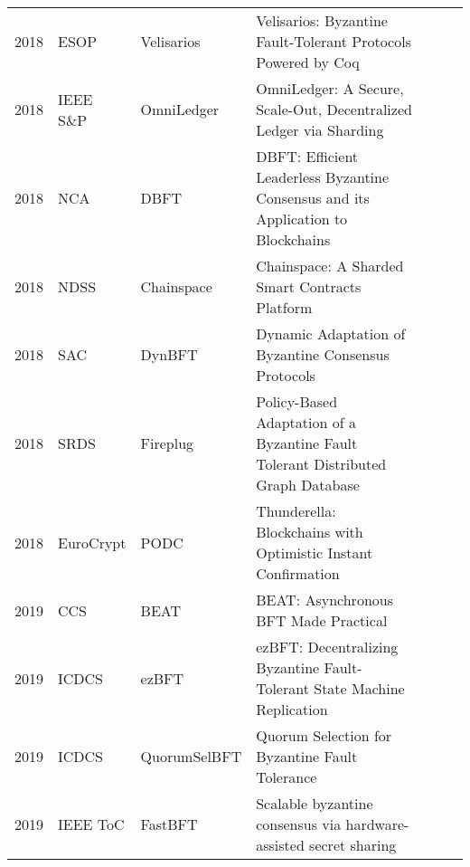 \documentclass{article}
\begin{document}
\begin{landscape}
\begin{table}[]
{\begin{tabular}{llll|l|l|l|}
2018 & ESOP              & Velisarios              & Velisarios: Byzantine Fault-Tolerant Protocols Powered by Coq                             &            &          &              \\ \cline{5-7} 
2018 & IEEE S\&P         & OmniLedger              & OmniLedger: A Secure, Scale-Out, Decentralized Ledger via Sharding                        &            &          &              \\ \cline{5-7} 
2018 & NCA               & DBFT                    & DBFT: Efficient Leaderless Byzantine Consensus and its Application to Blockchains         &            &          &              \\ \cline{5-7} 
2018 & NDSS              & Chainspace              & Chainspace: A Sharded Smart Contracts Platform                                            &            &          &              \\ \cline{5-7} 
2018 & SAC               & DynBFT                  & Dynamic Adaptation of Byzantine Consensus Protocols                                       &            &          &              \\ \cline{5-7} 
2018 & SRDS              & Fireplug                & Policy-Based Adaptation of a Byzantine Fault Tolerant Distributed Graph Database          &            &          &              \\ \cline{5-7} 
2018 & EuroCrypt         & PODC                    & Thunderella: Blockchains with Optimistic Instant Confirmation                             &            &          &              \\ \cline{5-7} 
2019 & CCS               & BEAT                    & BEAT: Asynchronous BFT Made Practical                                                     &            &          &              \\ \cline{5-7} 
2019 & ICDCS             & ezBFT                   & ezBFT: Decentralizing Byzantine Fault-Tolerant State Machine Replication                  &            &          &              \\ \cline{5-7} 
2019 & ICDCS             & QuorumSelBFT            & Quorum Selection for Byzantine Fault Tolerance                                            &            &          &              \\ \cline{5-7} 
2019 & IEEE ToC          & FastBFT                 & Scalable byzantine consensus via hardware-assisted secret sharing                         &            &          &              \\ \cline{5-7} 

\end{tabular}}
\end{table}
\end{landscape}
\end{document}
